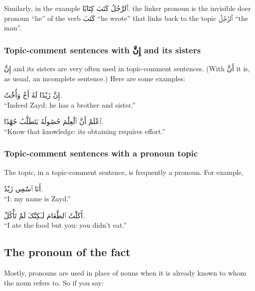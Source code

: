 \documentclass[
  10pt,
]{book}
\begin{document}
Similarly, in the example
\foreignlanguage{arabic}{ٱَلرَّجُلُ کَتَبَ کِتَابًا.}
the linker pronoun is the invisible doer pronoun \enquote{he} of the verb \foreignlanguage{arabic}{کَتَبَ} \enquote{he wrote} that links back to the topic \foreignlanguage{arabic}{ٱَلرَّجُلُ} \enquote{the man}.

\subsubsection{\texorpdfstring{Topic-comment sentences with \foreignlanguage{arabic}{إِنَّ} and its sisters}{Topic-comment sentences with إِنَّ and its sisters}}\label{topic-comment-sentences-with-ux625ux646-and-its-sisters}

\foreignlanguage{arabic}{إِنَّ} and its sisters are very often used in topic-comment sentences. (With \foreignlanguage{arabic}{أَنَّ} it is, as usual, an incomplete sentence.) Here are some examples:

\foreignlanguage{arabic}{إِنَّ زَيْدًا لَهُ أَخٌ وَأُخْتٌ.}\\
\enquote{Indeed Zayd: he has a brother and sister.}

\foreignlanguage{arabic}{ٱِعْلَمْ أَنَّ ٱلْعِلْمَ حُصُولُهُ يَتَطَلَّبُ جُهْدًا.}\\
\enquote{Know that knowledge: its obtaining requires effort.}

\subsubsection{Topic-comment sentences with a pronoun topic}\label{topic-comment-sentences-with-a-pronoun-topic}

The topic, in a topic-comment sentence, is frequently a pronoun. For example,

\foreignlanguage{arabic}{أَنَا ٱسْمِي زَيْدٌ.}\\
\enquote{I: my name is Zayd.}

\foreignlanguage{arabic}{أَکَلْتُ ٱلطَّعَامَ لَـٰکِنَّکَ لَمْ تَأْکُلْ.}\\
\enquote{I ate the food but you: you didn't eat.}

\subsection{The pronoun of the fact}\label{the-pronoun-of-the-fact}

Mostly, pronouns are used in place of nouns when it is already known to whom the noun refers to. So if you say:
\end{document}

